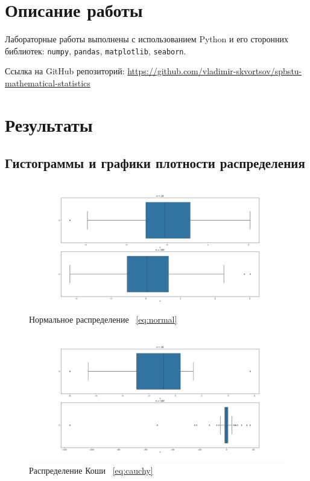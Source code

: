 \documentclass[12pt,a4paper]{article}
\begin{document}
	\section{Описание работы}

	Лабораторные работы выполнены с использованием Python и его сторонних
	библиотек: \verb!numpy!, \verb!pandas!, \verb!matplotlib!, \verb!seaborn!.

	Ссылка на GitHub репозиторий:
	\href{https://github.com/vladimir-skvortsov/spbstu-mathematical-statistics}
	{https://github.com/vladimir-skvortsov/spbstu-mathematical-statistics}

	\newpage

	\section{Результаты}

	\subsection{Гистограммы и графики плотности распределения}

	\begin{figure}[htbp!]
		\begin{center}
			\includegraphics[width = 1.12\linewidth]{graphics/lab2_normal.png}
			\caption{Нормальное распределение \ \eqref{eq:normal}}
		\end{center}
	\end{figure}

	\begin{figure}[htbp!]
		\begin{center}
			\includegraphics[width = 1.12\linewidth]{graphics/lab2_cauchy.png}
			\caption{Распределение Коши \ \eqref{eq:cauchy}}
		\end{center}
	\end{figure}
\end{document}
